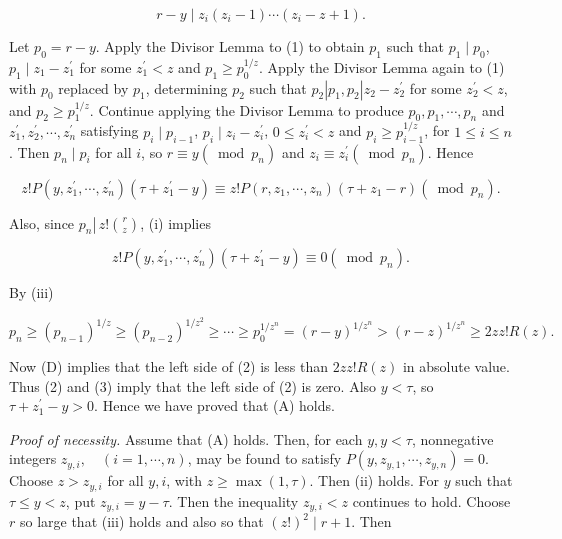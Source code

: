 \documentclass[11pt,a4paper]{article}
\begin{document}
\begin{equation*}
r-y \mid z_{i}\left(z_{i}-1\right) \cdots\left(z_{i}-z+1\right) . \tag{1}
\end{equation*}


Let $p_{0}=r-y$. Apply the Divisor Lemma to (1) to obtain $p_{1}$ such that $p_{1} \mid p_{0}$, $p_{1} \mid z_{1}-z_{1}^{\prime}$ for some $z_{1}^{\prime}<z$ and $p_{1} \geq p_{0}^{1 / z}$. Apply the Divisor Lemma again to (1) with $p_{0}$ replaced by $p_{1}$, determining $p_{2}$ such that $p_{2}\left|p_{1}, p_{2}\right| z_{2}-z_{2}^{\prime}$ for some $z_{2}^{\prime}<z$, and $p_{2} \geq p_{1}^{1 / z}$. Continue applying the Divisor Lemma to produce $p_{0}, p_{1}, \cdots, p_{n}$ and $z_{1}^{\prime}, z_{2}^{\prime}, \cdots, z_{n}^{\prime}$ satisfying $p_i\mid p_{i-1}$, $p_i\mid z_i-z_i^{\prime}$, $0\leq z_i^{\prime}<z$ and $p_i\geq p_{i-1}^{1/z}$, for $1\leq i\leq n$. Then $p_{n} \mid p_{i}$ for all $i$, so $r \equiv y\left(\bmod p_{n}\right)$ and $z_{i} \equiv z_{i}^{\prime}\left(\bmod p_{n}\right)$. Hence

$$
z!P\left(y, z_{1}^{\prime}, \cdots, z_{n}^{\prime}\right)\left(\tau+z_{1}^{\prime}-y\right) \equiv z!P\left(r, z_{1}, \cdots, z_{n}\right)\left(\tau+z_{1}-r\right)\left(\bmod p_{n}\right) .
$$

Also, since $p_{n} \left\lvert\, z!\binom{r}{z}\right.$, (i) implies


\begin{equation*}
z!P\left(y, z_{1}^{\prime}, \cdots, z_{n}^{\prime}\right)\left(\tau+z_{1}^{\prime}-y\right) \equiv 0\left(\bmod p_{n}\right) . \tag{2}
\end{equation*}


By (iii)


\begin{equation*}
p_{n} \geq\left(p_{n-1}\right)^{1 / z} \geq\left(p_{n-2}\right)^{1 / z^{2}} \geq \cdots \geq p_{0}^{1 / z^{n}}=(r-y)^{1 / z^{n}}>(r-z)^{1 / z^{n}} \geq 2 z z!R(z) . \tag{3}
\end{equation*}


Now (D) implies that the left side of (2) is less than $2 z z!R(z)$ in absolute value. Thus (2) and (3) imply that the left side of (2) is zero. Also $y<\tau$, so $\tau+z_{1}^{\prime}-y>0$. Hence we have proved that (A) holds.

\noindent\textit{Proof of necessity.} Assume that (A) holds. Then, for each $y, y<\tau$, nonnegative integers $z_{y, i}, \quad(i=1, \cdots, n)$, may be found to satisfy $P\left(y, z_{y, 1}, \cdots, z_{y, n}\right)=0$. Choose $z>z_{y,i}$ for all $y,i$, with $z\geq\max(1,\tau)$. Then (ii) holds. For $y$ such that $\tau \leq y<z$, put $z_{y, i}=y-\tau$. Then the inequality $z_{y, i}<z$ continues to hold. Choose $r$ so large that (iii) holds and also so that $(z!)^{2}\mid r+1$. Then
\end{document}
